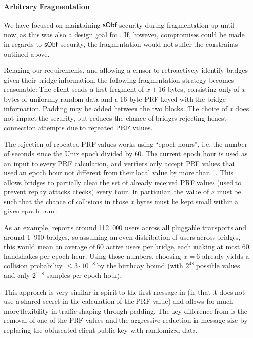 \paragraph{Arbitrary Fragmentation}
We have focused on maintaining $\mathsf{sObf}$ security during fragmentation up until now, as this was also a design goal for \drivel{}.
If, however, compromises could be made in regards to $\mathsf{sObf}$ security, the fragmentation would not suffer the constraints outlined above.

Relaxing our requirements, and allowing a censor to retroactively identify bridges given their bridge information, the following fragmentation strategy becomes reasonable: The client sends a first fragment of $x+16$ bytes, consisting only of $x$ bytes of uniformly random data and a 16 byte PRF keyed with the bridge information. Padding may be added between the two blocks. The choice of $x$ does not impact the security, but reduces the chance of bridges rejecting honest connection attempts due to repeated PRF values.

The rejection of repeated PRF values works using ``epoch hours'', i.e. the number of seconds since the Unix epoch divided by 60.
The current epoch hour is used as an input to every PRF calculation, and verifiers only accept PRF values that used an epoch hour not different from their local value by more than 1.
This allows bridges to partially clear the set of already received PRF values (used to prevent replay attacks checks) every hour.
In particular, the value of $x$ must be such that the chance of collisions in those $x$ bytes must be kept small within a given epoch hour.

As an example, \cite{tor-metrics} reports around 112~000 users across all pluggable transports and around 1~900 bridges, so assuming an even distribution of users across bridges, this would mean an average of 60 active users per bridge, each making at most 60 handshakes per epoch hour. Using those numbers, choosing $x=6$ already yields a collision probability $\leq 3 \cdot 10^{-8}$ by the birthday bound (with $2^{48}$ possible values and only $2^{11.8}$ samples per epoch hour).

This approach is very similar in spirit to the first message in \obfsfour{} (in that it does not use a shared secret in the calculation of the PRF value) and allows for much more flexibility in traffic shaping through padding. The key difference from \obfsfour{} is the removal of one of the PRF values and the aggressive reduction in message size by replacing the obfuscated client public key with randomized data.

